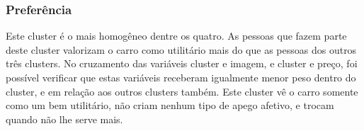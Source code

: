 \subsubsection{Preferência}
Este cluster é o mais homogêneo dentre os quatro. As pessoas que fazem
parte deste cluster valorizam o carro como utilitário mais do que
as pessoas dos outros três clusters. No cruzamento das variáveis cluster
e imagem, e cluster e preço, foi possível verificar que estas variáveis
receberam igualmente menor peso dentro do cluster, e em relação aos
outros clusters também. Este cluster vê o carro somente como um bem
utilitário, não criam nenhum tipo de apego afetivo, e trocam quando
não lhe serve mais. 
